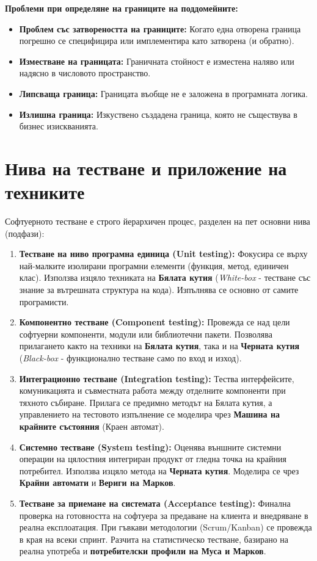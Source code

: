 \documentclass{scrartcl}
\begin{document}
\begin{FlushLeft}
\textbf{Проблеми при определяне на границите на поддомейните:}
\begin{itemize}
    \item \textbf{Проблем със затвореността на границите:} Когато една отворена граница погрешно се специфицира или имплементира като затворена (и обратно).
    \item \textbf{Изместване на границата:} Граничната стойност е изместена наляво или надясно в числовото пространство.
    \item \textbf{Липсваща граница:} Границата въобще не е заложена в програмната логика.
    \item \textbf{Излишна граница:} Изкуствено създадена граница, която не съществува в бизнес изискванията.
\end{itemize}

\section{Нива на тестване и приложение на техниките}

Софтуерното тестване е строго йерархичен процес, разделен на пет основни нива (подфази):
\begin{enumerate}
    \item \textbf{Тестване на ниво програмна единица (Unit testing):} Фокусира се върху най-малките изолирани програмни елементи (функция, метод, единичен клас). Използва изцяло техниката на \textbf{Бялата кутия} (\textit{White-box} - тестване със знание за вътрешната структура на кода). Изпълнява се основно от самите програмисти.
    \item \textbf{Компонентно тестване (Component testing):} Провежда се над цели софтуерни компоненти, модули или библиотечни пакети. Позволява прилагането както на техники на \textbf{Бялата кутия}, така и на \textbf{Черната кутия} (\textit{Black-box} - функционално тестване само по вход и изход).
    \item \textbf{Интеграционно тестване (Integration testing):} Тества интерфейсите, комуникацията и съвместната работа между отделните компоненти при тяхното събиране. Прилага се предимно методът на Бялата кутия, а управлението на тестовото изпълнение се моделира чрез \textbf{Машина на крайните състояния} (Краен автомат).
    \item \textbf{Системно тестване (System testing):} Оценява външните системни операции на цялостния интегриран продукт от гледна точка на крайния потребител. Използва изцяло метода на \textbf{Черната кутия}. Моделира се чрез \textbf{Крайни автомати} и \textbf{Вериги на Марков}.
    \item \textbf{Тестване за приемане на системата (Acceptance testing):} Финална проверка на готовността на софтуера за предаване на клиента и внедряване в реална експлоатация. При гъвкави методологии (Scrum/Kanban) се провежда в края на всеки спринт. Разчита на статистическо тестване, базирано на реална употреба и \textbf{потребителски профили на Муса и Марков}.
\end{enumerate}


\end{FlushLeft}
\end{document}
